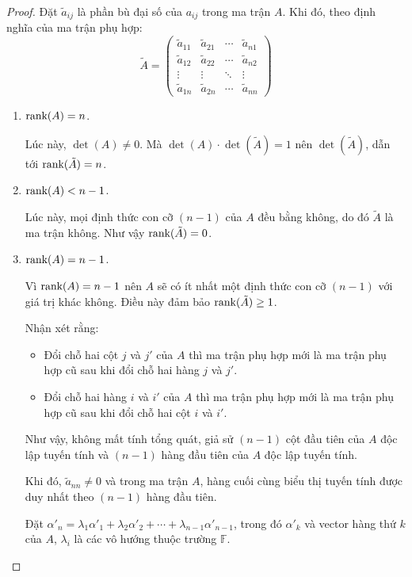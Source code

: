 \documentclass[class=linear-algebra,crop=false]{standalone}
\begin{document}
\begin{proof}
	\par Đặt $\tilde{a}_{ij}$ là phần bù đại số của $a_{ij}$ trong ma trận $A$. Khi đó, theo định nghĩa của ma trận phụ hợp:
	\[
		\tilde{A} =
		\begin{pmatrix}
			\tilde{a}_{11} & \tilde{a}_{21} & \cdots & \tilde{a}_{n1} \\
			\tilde{a}_{12} & \tilde{a}_{22} & \cdots & \tilde{a}_{n2} \\
			\vdots         & \vdots         & \ddots & \vdots         \\
			\tilde{a}_{1n} & \tilde{a}_{2n} & \cdots & \tilde{a}_{nn}
		\end{pmatrix}
	\]
	\begin{enumerate}[label = \textbf{Trường hợp \arabic*.},itemindent=2cm]
		\item $\text{rank}(A) = n$.
		      \par Lúc này, $\det(A)\ne 0$. Mà $\det(A)\cdot\det(\tilde{A}) = 1$ nên $\det(\tilde{A})$, dẫn tới $\text{rank}(\tilde{A}) = n$.
		\item $\text{rank}(A) < n - 1$.
		      \par Lúc này, mọi định thức con cỡ $(n-1)$ của $A$ đều bằng không, do đó $\tilde{A}$ là ma trận không. Như vậy $\text{rank}(\tilde{A}) = 0$.
		\item $\text{rank}(A) = n - 1$.
		      \par Vì $\text{rank}(A) = n - 1$ nên $A$ sẽ có ít nhất một định thức con cỡ $(n-1)$ với giá trị khác không. Điều này đảm bảo $\text{rank}(\tilde{A})\ge 1$.
		      \par Nhận xét rằng:
		      \begin{itemize}
			      \item Đổi chỗ hai cột $j$ và $j'$ của $A$ thì ma trận phụ hợp mới là ma trận phụ hợp cũ sau khi đổi chỗ hai hàng $j$ và $j'$.
			      \item Đổi chỗ hai hàng $i$ và $i'$ của $A$ thì ma trận phụ hợp mới là ma trận phụ hợp cũ sau khi đổi chỗ hai cột $i$ và $i'$.
		      \end{itemize}
		      \par Như vậy, không mất tính tổng quát, giả sử $(n-1)$ cột đầu tiên của $A$ độc lập tuyến tính và $(n-1)$ hàng đầu tiên của $A$ độc lập tuyến tính.
		      \par Khi đó, $\tilde{a}_{nn}\ne 0$ và trong ma trận $A$, hàng cuối cùng biểu thị tuyến tính được duy nhất theo $(n-1)$ hàng đầu tiên.
		      \par Đặt $\alpha'_{n} = \lambda_{1}\alpha'_{1} + \lambda_{2}\alpha'_{2} + \cdots + \lambda_{n-1}\alpha'_{n-1}$, trong đó $\alpha'_{k}$ và vector hàng thứ $k$ của $A$, $\lambda_{i}$ là các vô hướng thuộc trường $\mathbb{F}$.

\end{enumerate}
\end{proof}
\end{document}
